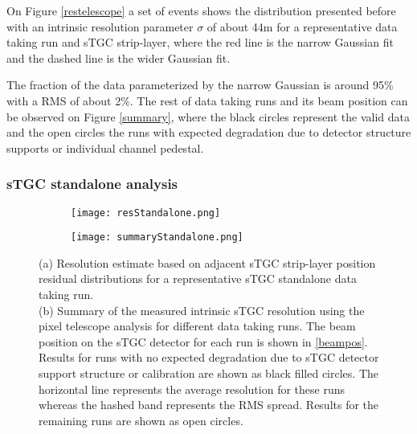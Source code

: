 On Figure \ref{restelescope} a set of events shows the distribution presented before with an intrinsic resolution
parameter $\sigma$ of about \unit{44}{\micro m} for a representative data taking run and sTGC strip-layer, where the red
line is the narrow Gaussian fit and the dashed line is the wider Gaussian fit.\par

The fraction of the data parameterized by the narrow Gaussian is around 95\% with a RMS of about 2\%.
The rest of data taking runs and its beam position can be observed on Figure \ref{summary}, where the black circles
represent the valid data and the open circles the runs with expected degradation due to detector structure supports or
individual channel pedestal.\par






\subsubsection{sTGC standalone analysis}
\begin{figure}[ht]
\centering
\hspace*{\fill}
\begin{subfigure}[b]{0.45\textwidth}
\centering
\texttt{[image: resStandalone.png]}
\caption{}\label{pairwise}
\end{subfigure}
\begin{subfigure}[b]{0.45\textwidth}
\centering
\texttt{[image: summaryStandalone.png]}
\caption{}\label{sss}
\end{subfigure}
\hspace*{\fill}
		\captionsetup{margin=1cm}
\caption{(a) Resolution estimate based on adjacent sTGC strip-layer position residual distributions for a
representative sTGC standalone data taking run.\\
(b) Summary of the measured intrinsic sTGC resolution using the
pixel telescope analysis for different data taking runs. The beam position on the sTGC detector for each run is
shown in \ref{beampos}. Results for runs with no expected degradation due to sTGC detector support structure or
calibration are shown as black filled circles. The horizontal line represents the average resolution for these runs
whereas the hashed band represents the RMS spread.  Results for the remaining runs are shown as open circles. }\label{}

\end{figure}

